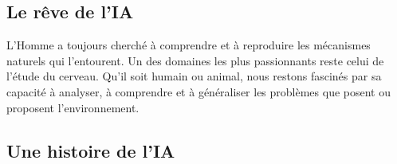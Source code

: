 \subsection{Le rêve de l'IA}
L’Homme a toujours cherché à comprendre et à reproduire les mécanismes naturels qui l'entourent. Un des domaines les plus passionnants reste celui de l'étude du cerveau. Qu'il soit humain ou animal, nous restons fascinés par sa capacité à analyser, à comprendre et à généraliser les problèmes que posent ou \og proposent \fg{} l'environnement.
\subsection{Une histoire de l'IA}